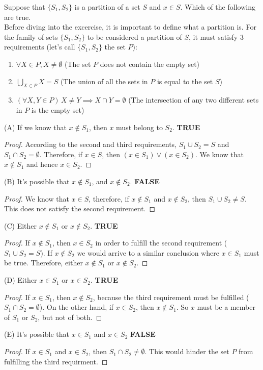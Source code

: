 \documentclass[12pt]{article}
\newenvironment{problem}[2][Problem]{\begin{trivlist}
		\item[\hskip \labelsep {\bfseries #1}\hskip \labelsep {\bfseries #2.}]}{\end{trivlist}}
\begin{document}
\begin{problem}{23}
	Suppose that $\{ S_1, S_2 \}$ is a partition of a set $S$ and $x \in S$. Which of the following are true. \\
	
	Before diving into the excercise, it is important to define what a partition is. For the family of sets $\{ S_1, S_2\}$ to be considered a partition of $S$, it must satisfy 3 requirements \cite{mathproofs} (let's call $\{S_1, S_2\} $ the set $P$):
	\begin{enumerate}
		\item $\forall X \in P, X \neq \emptyset$ (The set $P$ does not contain the empty set)
		\item $\bigcup_{X\in P} X = S$  (The union of all the sets in $P$ is equal to the set $S$)
		\item $(\forall X,Y \in P) \, X\neq Y \implies X\cap Y = \emptyset$ (The intersection of any two different sets in $P$ is the empty set)
	\end{enumerate}
(A) If we know that $x \notin S_1$, then $x$ must belong to $S_2$. \textbf{ TRUE}
\begin{proof}
	According to the second and third requirements, $S_1 \cup S_2 = S$ and $S_1 \cap S_2 = \emptyset$. Therefore, if $x \in S$, then $(x \in S_1) \vee (x \in S_2)$. We know that $x \notin S_1$ and hence $x \in S_2$.
\end{proof}
(B) It's possible that $x \notin S_1$, and $x \notin S_2$. \textbf{ FALSE}
\begin{proof}
	We know that $x \in S$, therefore, if $x \notin S_1$ and $x \notin S_2$, then $S_1 \cup S_2 \neq S$. This does not satisfy the second requirement. 
\end{proof}
(C) Either $x \notin S_1$ or $x \notin S_2$. \textbf{ TRUE}
\begin{proof}
	 If $x \notin S_1$, then $x \in S_2$ in order to fulfill the second requirement ($S_1 \cup S_2 = S$). If $x \notin S_2$ we would arrive to a similar conclusion where $x \in S_1$ must be true. Therefore, either $x \notin S_1$ or $x \notin S_2$. 
\end{proof}
(D) Either $x \in S_1$ or $x \in S_2$. \textbf{ TRUE}
\begin{proof}
	If $x \in S_1$, then $x \notin S_2$, because the third requirement must be fulfilled ($S_1 \cap S_2 = \emptyset$). On the other hand, if $x \in S_2$, then $x \notin S_1$. So $x$ must be a member of $S_1$ or $S_2$, but not of both. 
\end{proof}
(E) It's possible that $x \in S_1$ and $x \in S_2$ \textbf{ FALSE}
\begin{proof}
	If $x \in S_1$ and $x \in S_2$, then $S_1 \cap S_2 \neq \emptyset$. This would hinder the set $P$ from fulfilling the third requirment. 
\end{proof}
\end{problem}
\end{document}
